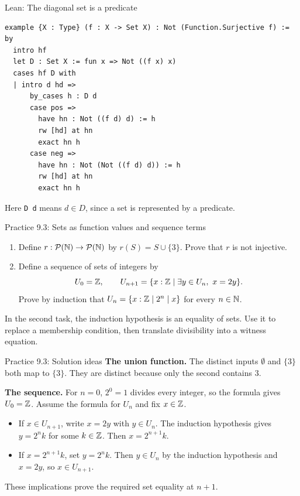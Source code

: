 \begin{frame}[fragile]{Lean: The diagonal set is a predicate}
\begin{lstlisting}
example {X : Type} (f : X -> Set X) : Not (Function.Surjective f) := by
  intro hf
  let D : Set X := fun x => Not ((f x) x)
  cases hf D with
  | intro d hd =>
      by_cases h : D d
      case pos =>
        have hn : Not ((f d) d) := h
        rw [hd] at hn
        exact hn h
      case neg =>
        have hn : Not (Not ((f d) d)) := h
        rw [hd] at hn
        exact hn h
\end{lstlisting}
Here \texttt{D d} means $d\in D$, since a set is represented by a predicate.
\end{frame}

\begin{frame}{Practice 9.3: Sets as function values and sequence terms}
\begin{enumerate}
\item Define $r:\mathcal P(\mathbb{N})\to\mathcal P(\mathbb{N})$ by $r(S)=S\cup\{3\}$.
Prove that $r$ is not injective.
\item Define a sequence of sets of integers by
\[
 U_0=\mathbb{Z},\qquad
 U_{n+1}=\{x:\mathbb{Z}\mid\exists y\in U_n,\ x=2y\}.
\]
Prove by induction that $U_n=\{x:\mathbb{Z}\mid2^n\mid x\}$ for every $n\in\mathbb{N}$.
\end{enumerate}
In the second task, the induction hypothesis is an equality of sets.
Use it to replace a membership condition, then translate divisibility into a witness equation.
\end{frame}

\begin{frame}{Practice 9.3: Solution ideas}
\textbf{The union function.} The distinct inputs $\emptyset$ and $\{3\}$ both map to
$\{3\}$. They are distinct because only the second contains $3$.
\medskip

\textbf{The sequence.} For $n=0$, $2^0=1$ divides every integer, so the formula gives $U_0=\mathbb{Z}$.
Assume the formula for $U_n$ and fix $x\in\mathbb{Z}$.
\begin{itemize}
\item If $x\in U_{n+1}$, write $x=2y$ with $y\in U_n$.
The induction hypothesis gives $y=2^n k$ for some $k\in\mathbb{Z}$.
Then $x=2^{n+1}k$.
\item If $x=2^{n+1}k$, set $y=2^n k$.
Then $y\in U_n$ by the induction hypothesis and $x=2y$, so $x\in U_{n+1}$.
\end{itemize}
These implications prove the required set equality at $n+1$.
\end{frame}

